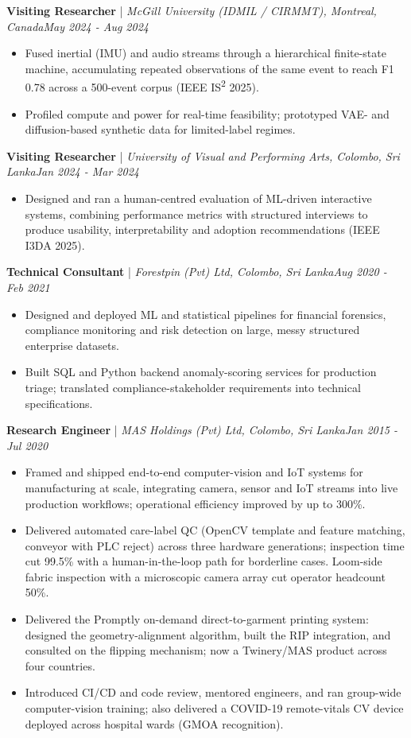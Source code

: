 \documentclass[11pt]{article}
\newenvironment{cvrole}[5]{%
  \par\noindent\textbf{\large #1} | \textit{\small #2, #3}\hfill \textit{\small #4 - #5}\par
  \begin{itemize}[leftmargin=2em, itemsep=-0.3em, topsep=-0.5em]%
}{%
  \end{itemize}\par\noindent\mbox{}\par\vspace{0.1em}%
}
\begin{document}
\begin{cvrole}{Visiting Researcher}{McGill University (IDMIL / CIRMMT)}{Montreal, Canada}{May 2024}{Aug 2024}
    \item Fused inertial (IMU) and audio streams through a hierarchical finite-state machine, accumulating repeated observations of the same event to reach F1 0.78 across a 500-event corpus (IEEE IS\textsuperscript{2} 2025).
    \item Profiled compute and power for real-time feasibility; prototyped VAE- and diffusion-based synthetic data for limited-label regimes.
\end{cvrole}

\begin{cvrole}{Visiting Researcher}{University of Visual and Performing Arts}{Colombo, Sri Lanka}{Jan 2024}{Mar 2024}
    \item Designed and ran a human-centred evaluation of ML-driven interactive systems, combining performance metrics with structured interviews to produce usability, interpretability and adoption recommendations (IEEE I3DA 2025).
\end{cvrole}

\begin{cvrole}{Technical Consultant}{Forestpin (Pvt) Ltd}{Colombo, Sri Lanka}{Aug 2020}{Feb 2021}
    \item Designed and deployed ML and statistical pipelines for financial forensics, compliance monitoring and risk detection on large, messy structured enterprise datasets.
    \item Built SQL and Python backend anomaly-scoring services for production triage; translated compliance-stakeholder requirements into technical specifications.
\end{cvrole}

\begin{cvrole}{Research Engineer}{MAS Holdings (Pvt) Ltd}{Colombo, Sri Lanka}{Jan 2015}{Jul 2020}
    \item Framed and shipped end-to-end computer-vision and IoT systems for manufacturing at scale, integrating camera, sensor and IoT streams into live production workflows; operational efficiency improved by up to 300\%.
    \item Delivered automated care-label QC (OpenCV template and feature matching, conveyor with PLC reject) across three hardware generations; inspection time cut 99.5\% with a human-in-the-loop path for borderline cases. Loom-side fabric inspection with a microscopic camera array cut operator headcount 50\%.
    \item Delivered the Promptly on-demand direct-to-garment printing system: designed the geometry-alignment algorithm, built the RIP integration, and consulted on the flipping mechanism; now a Twinery/MAS product across four countries.
    \item Introduced CI/CD and code review, mentored engineers, and ran group-wide computer-vision training; also delivered a COVID-19 remote-vitals CV device deployed across hospital wards (GMOA recognition).
\end{cvrole}
\end{document}

